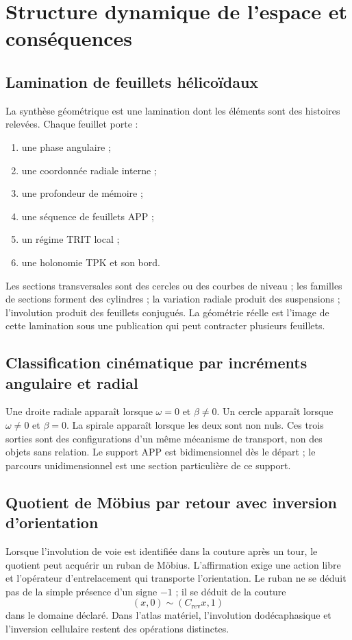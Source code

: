 \chapter{Structure dynamique de l'espace et conséquences}

\section{Lamination de feuillets hélicoïdaux}

La synthèse géométrique est une lamination dont les éléments sont des histoires relevées. Chaque feuillet porte :
\begin{enumerate}
\item une phase angulaire ;
\item une coordonnée radiale interne ;
\item une profondeur de mémoire ;
\item une séquence de feuillets APP ;
\item un régime TRIT local ;
\item une holonomie TPK et son bord.
\end{enumerate}
Les sections transversales sont des cercles ou des courbes de niveau ; les familles de sections forment des cylindres ; la variation radiale produit des suspensions ; l'involution produit des feuillets conjugués. La géométrie réelle est l'image de cette lamination sous une publication qui peut contracter plusieurs feuillets.

\section{Classification cinématique par incréments angulaire et radial}

Une droite radiale apparaît lorsque \(\omega=0\) et \(\beta\neq0\). Un cercle apparaît lorsque \(\omega\neq0\) et \(\beta=0\). La spirale apparaît lorsque les deux sont non nuls. Ces trois sorties sont des configurations d'un même mécanisme de transport, non des objets sans relation. Le support APP est bidimensionnel dès le départ ; le parcours unidimensionnel est une section particulière de ce support.

\section{Quotient de Möbius par retour avec inversion d'orientation}

Lorsque l'involution de voie est identifiée dans la couture après un tour, le quotient peut acquérir un ruban de Möbius. L'affirmation exige une action libre et l'opérateur d'entrelacement qui transporte l'orientation. Le ruban ne se déduit pas de la simple présence d'un signe \(-1\) ; il se déduit de la couture
\[
 (x,0)\sim(C_{\mathrm{rev}}x,1)
\]
dans le domaine déclaré. Dans l'atlas matériel, l'involution dodécaphasique et l'inversion cellulaire restent des opérations distinctes.


